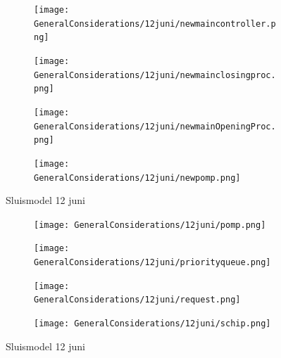 \documentclass{article}
\begin{document}
	\begin{figure}
		\centering
		\begin{subfigure}{0.45\linewidth}
			\texttt{[image: GeneralConsiderations/12juni/newmaincontroller.png]}
			\caption{}
			\label{fig:1a}
		\end{subfigure}\hfill
		\begin{subfigure}{0.45\linewidth}
			\texttt{[image: GeneralConsiderations/12juni/newmainclosingproc.png]}
			\caption{}
			\label{fig:1a}
		\end{subfigure}
		
		\begin{subfigure}{0.45\linewidth}
			\texttt{[image: GeneralConsiderations/12juni/newmainOpeningProc.png]}
			\caption{}
			\label{fig:1a}
		\end{subfigure}\hfill
		\begin{subfigure}{0.45\linewidth}
			\texttt{[image: GeneralConsiderations/12juni/newpomp.png]}
			\caption{}
			\label{fig:1a}
		\end{subfigure}
		\caption{Sluismodel 12 juni}
		\label{fig:1}
	\end{figure}
	\begin{figure}
		\centering
		\begin{subfigure}{0.45\linewidth}
			\texttt{[image: GeneralConsiderations/12juni/pomp.png]}
			\caption{}
			\label{fig:1a}
		\end{subfigure}\hfill
		\begin{subfigure}{0.45\linewidth}
			\texttt{[image: GeneralConsiderations/12juni/priorityqueue.png]}
			\caption{}
			\label{fig:1a}
		\end{subfigure}
		
		\begin{subfigure}{0.45\linewidth}
			\texttt{[image: GeneralConsiderations/12juni/request.png]}
			\caption{}
			\label{fig:1a}
		\end{subfigure}\hfill
		\begin{subfigure}{0.45\linewidth}
			\texttt{[image: GeneralConsiderations/12juni/schip.png]}
			\caption{}
			\label{fig:1a}
		\end{subfigure}
		\caption{Sluismodel 12 juni}
		\label{fig:1}
	\end{figure}
\end{document}
